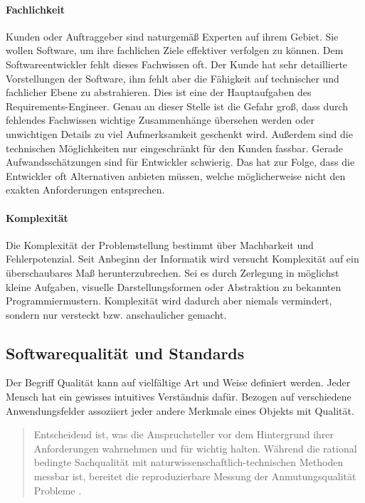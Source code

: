\paragraph{Fachlichkeit}
Kunden oder Auftraggeber sind naturgemäß Experten auf ihrem Gebiet. Sie wollen Software, um ihre fachlichen Ziele effektiver verfolgen zu können. Dem Softwareentwickler fehlt dieses Fachwissen oft.
Der Kunde hat sehr detaillierte Vorstellungen der Software, ihm fehlt aber die Fähigkeit auf technischer und fachlicher Ebene zu abstrahieren. Dies ist eine der Hauptaufgaben des Requirements-Engineer. Genau an dieser Stelle ist die Gefahr groß, dass durch fehlendes Fachwissen wichtige Zusammenhänge übersehen werden oder unwichtigen Details zu viel Aufmerksamkeit geschenkt wird.
Außerdem sind die technischen Möglichkeiten nur eingeschränkt für den Kunden fassbar. Gerade Aufwandsschätzungen sind für Entwickler schwierig. Das hat zur Folge, dass die Entwickler oft Alternativen anbieten müssen, welche möglicherweise nicht den exakten Anforderungen entsprechen.

\paragraph{Komplexität}
Die Komplexität der Problemstellung bestimmt über Machbarkeit und Fehlerpotenzial. Seit Anbeginn der Informatik wird versucht Komplexität auf ein überschaubares Maß herunterzubrechen. Sei es durch Zerlegung in möglichst kleine Aufgaben, visuelle Darstellungsformen oder Abstraktion zu bekannten Programmiermustern.
Komplexität wird dadurch aber niemals vermindert, sondern nur versteckt bzw. anschaulicher gemacht.


\subsection{Softwarequalität und Standards}
\label{sec:quality}
Der Begriff Qualität kann auf vielfältige Art und Weise definiert werden. Jeder Mensch hat ein gewisses intuitives Verständnis dafür. Bezogen auf verschiedene Anwendungsfelder assoziiert jeder andere Merkmale eines Objekts mit Qualität.

\begin{quote}
Entscheidend ist, was die Anspruchsteller vor dem Hintergrund ihrer Anforderungen wahrnehmen und für wichtig halten. Während die rational bedingte Sachqualität mit naturwissenschaftlich-technischen Methoden messbar ist, bereitet die reproduzierbare Messung der Anmutungsqualität Probleme \cite{markgraf_definition_2015}.
\end{quote}

